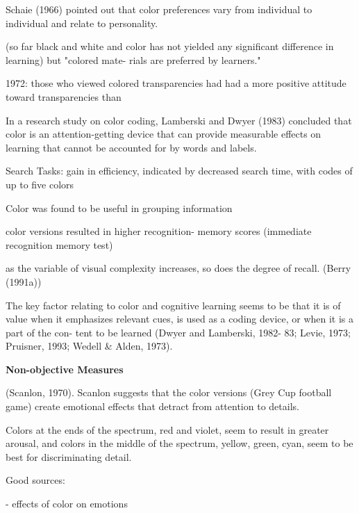 		Schaie (1966) pointed out that color preferences vary from individual to individual and relate to personality. \cite{Pert1996}
		
		(so far black and white and color has not yielded any significant difference in learning) but "colored mate- rials are preferred by learners." \cite{Pert1996}
		
		1972: those who viewed colored transparencies had had a more positive attitude toward transparencies than \cite{Pert1996}
		
		In a research study on color coding, Lamberski and Dwyer (1983) concluded that color is an attention-getting device that can provide measurable effects on learning that cannot be accounted for by words and labels. \cite{Pert1996}
		
		Search Tasks: 
		gain in efficiency, indicated by decreased search time, with codes of up to five colors \cite{Pert1996}
		
		Color was found to be useful in grouping information
		
		color versions resulted in higher recognition- memory scores (immediate recognition memory test)\cite{Pert1996}
		
		as the variable of visual complexity increases, so does the degree of recall. (Berry (1991a)) \cite{Pert1996}
		
		The key factor relating to color and cognitive learning seems to be that it is of value when it emphasizes relevant cues, is used as a coding device, or when it is a part of the con- tent to be learned (Dwyer and Lamberski, 1982- 83; Levie, 1973; Pruisner, 1993; Wedell \& Alden, 1973). \cite{Pert1996}
		
		\textbf{Non-objective Measures}
		
		(Scanlon, 1970). Scanlon suggests that the color versions (Grey Cup football game) create emotional effects that detract from attention to details.
		
		
		
		
		
		
		
		Colors at the ends of the spectrum, red and
		violet, seem to result in greater arousal, and
		colors in the middle of the spectrum, yellow,
		green, cyan, seem to be best for discriminating
		detail. \cite{Pert1996}
		
		
		Good sources:
		
		\cite{Valdez1994} - effects of color on emotions
		
